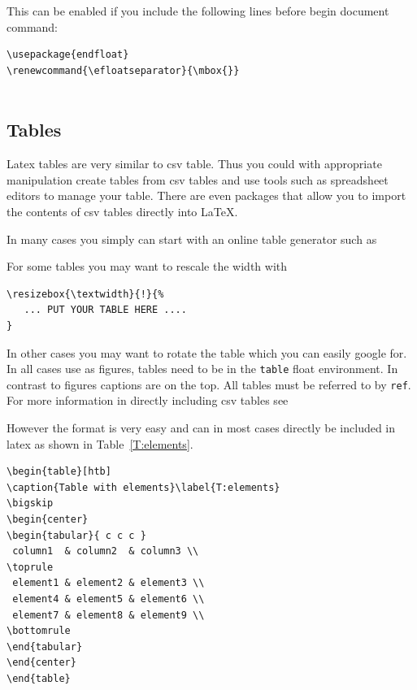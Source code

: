 This can be enabled if you include the following lines before begin
document command:

\begin{verbatim}
\usepackage{endfloat}
\renewcommand{\efloatseparator}{\mbox{}} 


\end{verbatim}

\subsection{Tables}\label{tables}

Latex tables are very similar to csv table. Thus you could with
appropriate manipulation create tables from csv tables and use tools
such as spreadsheet editors to manage your table. There are even
packages that allow you to import the contents of csv tables directly
into \LaTeX.

In many cases you simply can start with an online table generator such as


For some tables you may want to rescale the width with

\begin{verbatim}
\resizebox{\textwidth}{!}{%
   ... PUT YOUR TABLE HERE ....
}
\end{verbatim}

In other cases you may want to rotate the table which you can easily
google for. In all cases use as figures, tables need to be in the
\verb|table| float environment. In contrast to figures captions are on
the top. All tables must be referred to by \verb|ref|. For more
information in directly including csv tables see 


However the format is very easy and can in most cases directly be
included in latex as shown in Table~\ref{T:elements}.

\begin{verbatim}
\begin{table}[htb]
\caption{Table with elements}\label{T:elements}
\bigskip
\begin{center}
\begin{tabular}{ c c c }
 column1  & column2  & column3 \\
\toprule
 element1 & element2 & element3 \\ 
 element4 & element5 & element6 \\  
 element7 & element8 & element9 \\
\bottomrule
\end{tabular}
\end{center}
\end{table}
\end{verbatim}

